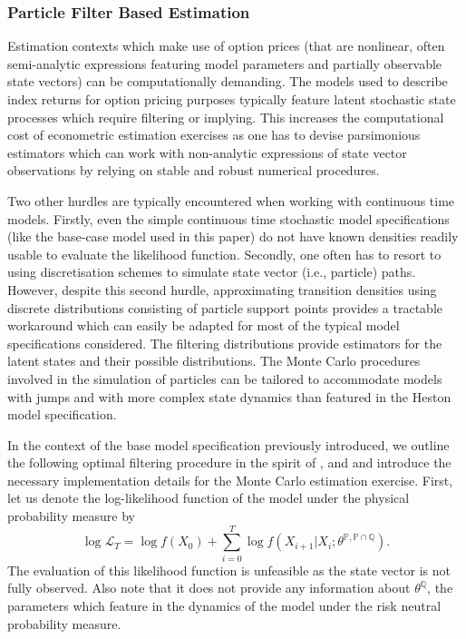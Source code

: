 \documentclass[11pt,a4paper,notitlepage]{article}
\numberwithin{equation}{section}
\begin{document}
 
\subsubsection{Particle Filter Based Estimation}
Estimation contexts which make use of option prices (that are nonlinear, often semi-analytic expressions featuring model parameters and partially observable state vectors) can be computationally demanding. The models used to describe index returns for option pricing purposes typically feature latent stochastic state processes which require filtering  or implying. This increases the computational cost of econometric estimation exercises as one has to devise parsimonious estimators which can work with non-analytic expressions of state vector observations by relying on stable and robust numerical procedures. 


Two other hurdles are typically encountered when working with continuous time models. Firstly, even the simple continuous time stochastic model specifications (like the base-case model used in this paper) do not have known densities readily usable to evaluate the likelihood function. Secondly, one often has to resort to using discretisation schemes to simulate state vector (i.e., particle) paths. However, despite this second hurdle, approximating transition densities using discrete distributions consisting of particle support points provides a tractable workaround which can easily be adapted for most of the typical model specifications considered. The filtering distributions provide estimators for the latent states and their possible distributions. The Monte Carlo procedures involved in the simulation of particles can be tailored to accommodate models with jumps and with more complex state dynamics than featured in the Heston model specification. 

In the context of the base model specification previously introduced, we outline the following optimal filtering procedure in the spirit of \citet{johannes2009optimal}, \citet{christoffersen2010volatility} and \citet{hurn2015pf} and introduce the necessary implementation details for the Monte Carlo estimation exercise. First, let us denote the log-likelihood function of the model under the physical probability measure by
\begin{equation}
\log \mathcal{L}_T = \log f(X_0) + \sum_{i=0}^T \log f(X_{i+1}|X_{i};\theta^{\mathbb{P},\mathbb{P}\cap\mathbb{Q}}).
\end{equation}
The evaluation of this likelihood function is unfeasible as the state vector is not fully observed. Also note that it does not provide any information about $\theta^\mathbb{Q}$, the parameters which feature in the dynamics of the model under the risk neutral probability measure.
 
\end{document}

